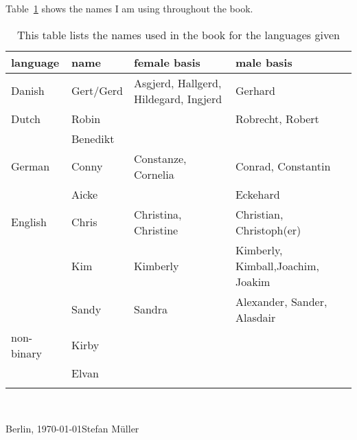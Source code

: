 
Table~\ref{table-given-names-used-in-the-book} shows the names I am using throughout the book.

\begin{table}
\begin{tabular}{llp{4cm}p{4cm}}\lsptoprule
language    & name      & female basis         & male basis\\\midrule
Danish      & Gert/Gerd & Asgjerd, Hallgerd, Hildegard, Ingjerd        & Gerhard\\
Dutch       & Robin     &                      & Robrecht, Robert\\ %
            & Benedikt \\
German      & Conny     & Constanze, Cornelia  & Conrad, Constantin\\
            & Aicke     & & Eckehard \\
English     & Chris     & Christina, Christine & Christian, Christoph(er)\\
            & Kim       & Kimberly             & Kimberly, Kimball,\newline Joachim, Joakim\\
            & Sandy     & Sandra               & Alexander, Sander, Alasdair\\
non-binary  & Kirby\\
            & Elvan\\%
\lspbottomrule
\end{tabular}
\caption{\label{table-given-names-used-in-the-book}This table lists the names used in the book for
  the languages given}
\end{table}

\fi

~\medskip

\noindent
Berlin, \today\hfill Stefan Müller




